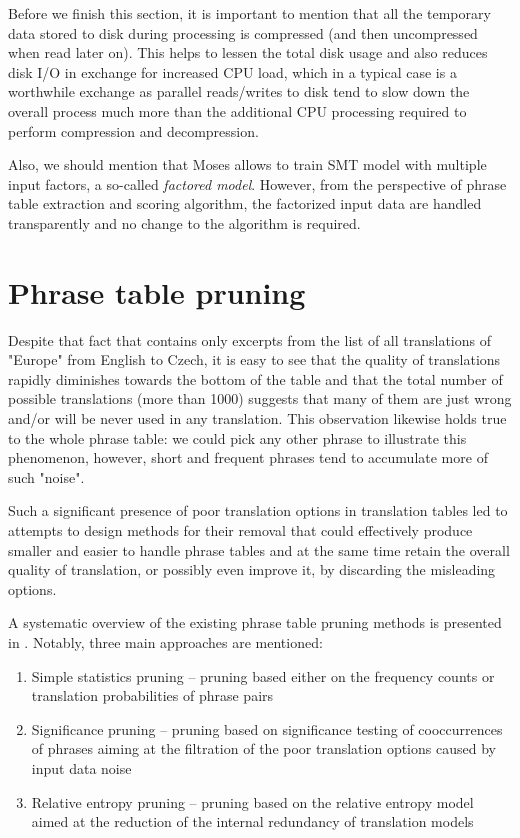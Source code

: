 Before we finish this section, it is important to mention that all
the temporary data stored to disk during processing is compressed
(and then uncompressed when read later on).
This helps to lessen the total disk usage and also reduces disk I/O in exchange for
increased CPU load, which in a typical case is a worthwhile exchange as parallel reads/writes
to disk tend to slow down the overall process much more than the additional
CPU processing required to perform compression and decompression.

Also, we should mention that Moses allows to train SMT model with multiple input
factors, a so-called \emph{factored model}.
However, from the perspective of phrase table extraction and scoring algorithm,
the factorized input data are handled transparently and no change to the algorithm
is required.

\section{Phrase table pruning}
\label{sec:phrase-table-pruning}

Despite that fact that  contains only excerpts from the list
of all translations of "Europe" from English to Czech, it is easy to see
that the quality of translations rapidly diminishes towards the bottom of the table
and that the total number of possible translations (more than 1000) suggests
that many of them are just wrong and/or will be never used in any translation.
This observation likewise holds true to the whole phrase table: we could pick
any other phrase to illustrate this phenomenon, however, short and frequent
phrases tend to accumulate more of such "noise".

Such a significant presence of poor translation options in translation tables led to
attempts to design methods for their removal that could effectively produce smaller and
easier to handle phrase tables and at the same time retain the overall quality of
translation, or possibly even improve it, by discarding the misleading options.

A systematic overview of the existing phrase table pruning methods is presented in
\citep{zens:systcomp}.
Notably, three main approaches are mentioned:
\begin{enumerate}
  \item Simple statistics pruning -- pruning based either on the frequency counts or
    translation probabilities of phrase pairs
  \item Significance pruning -- pruning based on significance testing of
    cooccurrences of phrases aiming at the filtration of the poor translation options
    caused by input data noise
  \item Relative entropy pruning -- pruning based on the relative entropy model
    aimed at the reduction of the internal redundancy of translation models
\end{enumerate}


